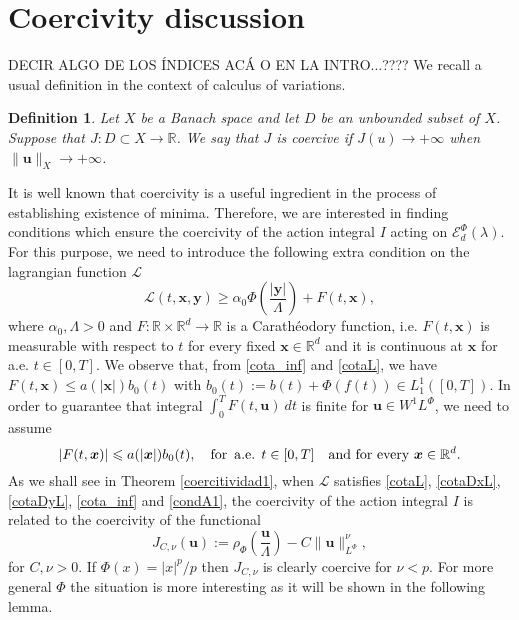 \documentclass[twoside]{article}
\newtheorem{defi}[thm]{Definition}
\theoremstyle{remark}
\newcommand{\orlnor}{\|_{L^{\Phi}}}
\newcommand{\lphi}{L^{\Phi}}
\newcommand{\wphi}{W^{1}\lphi}
\newcommand{\domi}{\mathcal{E}^{\Phi}_d(\lambda)}
\renewcommand{\b}[1]{\boldsymbol{#1}}
\newcommand{\rr}{\mathbb{R}}
\renewcommand{\leq}{\leqslant}
\begin{document}
\section{Coercivity discussion}\label{sec:coer}
DECIR ALGO DE LOS \'INDICES AC\'A O EN LA INTRO...????
We recall a usual definition in the context of calculus of variations. 

\begin{defi} Let $X$ be a Banach space and let $D$ be an unbounded subset of $X$. Suppose that $J:D\subset X\to\rr$. We say that $J$ is \emph{coercive} if $J(u)\to +\infty$ when  $\|\b{u}\|_X\to +\infty$. 
\end{defi}

It is well known that coercivity is a useful ingredient in the process of establishing existence of minima. Therefore, we are interested in finding conditions which ensure the coercivity of the action integral $I$ acting on $\domi$. For this purpose, we need to introduce the following  extra condition on the lagrangian function $\mathcal{L}$  
\begin{equation}\label{cota_inf}
\mathcal{L}(t,\b{x},\b{y})\geq \alpha_0\Phi\left(\frac{|\b{y}|}{\Lambda}\right)+ F(t,\b{x}),
\end{equation}
where $\alpha_0,\Lambda>0$ and  $F:\rr\times\rr^d\to\rr$ is a Carath\'eodory function, i.e. $F(t,\b{x})$ is  measurable with respect to $t$ for every fixed  $\b{x}\in\rr^d$ and it is continuous at $\b{x}$ for a.e. $t\in [0,T]$. We observe that, from \eqref{cota_inf} and \eqref{cotaL}, we have $F(t,\b{x})\leq a(|\b{x}|)b_0(t)$  with $b_0(t):=b(t)+\Phi(f(t))\in L^1_1([0,T])$. In order to guarantee that integral $\int_0^TF(t,\b{u})\ dt$ is finite for $\b{u}\in\wphi$,  we need to assume 
\begin{equation}\label{condA1} |F(t,\b{x})|\leq a(|\b{x}|)b_0(t),\quad\text{for \,a.e. }t\in [0,T] \quad\text{and for every } \b{x}\in\rr^d.
\end{equation}
As we shall see in Theorem \ref{coercitividad1}, when $\mathcal{L}$ satisfies \eqref{cotaL}, \eqref{cotaDxL}, \eqref{cotaDyL}, \eqref{cota_inf} and \eqref{condA1},  the coercivity of the action integral $I$ is related to the coercivity of the functional
\begin{equation}\label{func_phi}
  J_{C,\nu}(\b{u}):= \rho_{\Phi}\left(\frac{\b{u}}{\Lambda}\right)-C\|\b{u}\orlnor^{\nu},
\end{equation}
for $C,\nu>0$. If $\Phi(x)=|x|^p/p$ then $J_{C,\nu}$ is clearly coercive for $\nu<p$. For more general $\Phi$ the situation is more interesting   as it will be shown in the following lemma.
\end{document}
